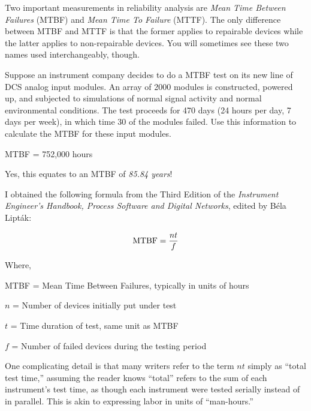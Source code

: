 

Two important measurements in reliability analysis are {\it Mean Time Between Failures} (MTBF) and {\it Mean Time To Failure} (MTTF).  The only difference between MTBF and MTTF is that the former applies to repairable devices while the latter applies to non-repairable devices.  You will sometimes see these two names used interchangeably, though.

Suppose an instrument company decides to do a MTBF test on its new line of DCS analog input modules.  An array of 2000 modules is constructed, powered up, and subjected to simulations of normal signal activity and normal environmental conditions.  The test proceeds for 470 days (24 hours per day, 7 days per week), in which time 30 of the modules failed.  Use this information to calculate the MTBF for these input modules.







MTBF = 752,000 hours







Yes, this equates to an MTBF of {\it 85.84 years}!

\vskip 10pt

I obtained the following formula from the Third Edition of the {\it Instrument Engineer's Handbook, Process Software and Digital Networks}, edited by B\'ela Lipt\'ak:

$$\hbox{MTBF} = {nt \over f}$$

\noindent
Where,

MTBF = Mean Time Between Failures, typically in units of hours

$n$ = Number of devices initially put under test

$t$ = Time duration of test, same unit as MTBF

$f$ = Number of failed devices during the testing period

\vskip 10pt

One complicating detail is that many writers refer to the term $nt$ simply as ``total test time,'' assuming the reader knows ``total'' refers to the sum of each instrument's test time, as though each instrument were tested serially instead of in parallel.  This is akin to expressing labor in units of ``man-hours.''


